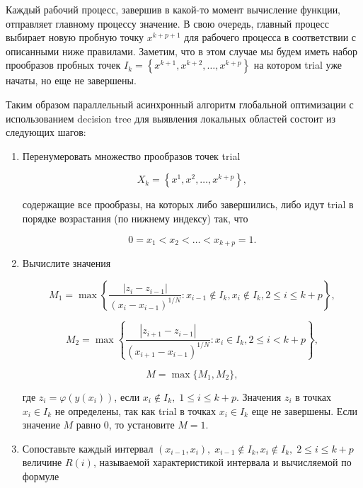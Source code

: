 \documentclass{svproc}
\begin{document}
Каждый рабочий процесс, завершив в какой-то момент вычисление функции, отправляет главному процессу значение. В свою очередь, главный процесс выбирает новую пробную точку $x^{k+p+1}$ для рабочего процесса в соответствии с описанными ниже правилами. Заметим, что в этом случае мы будем иметь набор прообразов пробных точек 
$I_k=\left\{x^{k+1},x^{k+2},\ldots,x^{k+p}\right\}$
на котором trial уже начаты, но еще не завершены.

Таким образом параллельный асинхронный алгоритм глобальной оптимизации с использованием decision tree для выявления локальных областей состоит из следующих шагов:

\begin{enumerate}
\item  Перенумеровать множество прообразов точек trial

\begin{displaymath}
X_k=\left\{x^1,x^2,\ldots,x^{k+p}\right\},
\end{displaymath}

содержащие все прообразы, на которых либо завершились, либо идут trial в порядке возрастания (по нижнему индексу) так, что

\begin{displaymath}
0=x_1<x_2<\ldots<x_{k+p}=1.
\end{displaymath}

\item  Вычислите значения

\begin{displaymath}
M_1=\max{\left\{\frac{\left|z_i-z_{i-1}\right|}{\left(x_i-x_{i-1}\right)^{1/N}}:x_{i-1}\notin I_k,x_i\notin I_k,2\le i\le k+p\right\}},
\end{displaymath}

\begin{displaymath}
M_2=\max{\left\{\frac{\left|z_{i+1}-z_{i-1}\right|}{\left(x_{i+1}-x_{i-1}\right)^{1/N}}:x_i\in I_k,2\le i<k+p\right\}},
\end{displaymath}

\begin{displaymath}
M=\max{\{}M_1,M_2\},
\end{displaymath}

где $ z_i=\varphi\left(y\left(x_i\right)\right)$, если $x_i\notin I_k,\;1\le i\le k+p$. Значения $z_i$ в точках $x_i\in I_k$ не определены, так как trial в точках $x_i\in I_k$ еще не завершены. Если значение $M$ равно $0$, то установите $M=1$.

\item  Сопоставьте каждый интервал $\left(x_{i-1},x_i\right),\;x_{i-1}\notin I_k,x_i\notin I_k,\;2\le i\le k+p$ величине $R\left(i\right)$, называемой характеристикой интервала и вычисляемой по формуле


\end{enumerate}
\end{document}
